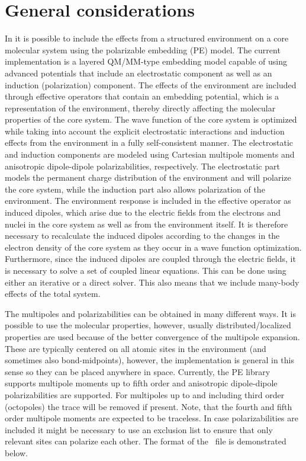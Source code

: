 \section{General considerations}
In {\dalton} it is possible to include the effects from a structured
environment on a core molecular system using the polarizable embedding (PE)
model. The current implementation is a layered QM/MM-type embedding model
capable of using advanced potentials that include an electrostatic component as
well as an induction (polarization) component. The effects of the environment
are included through effective operators that contain an embedding potential,
which is a representation of the environment, thereby directly affecting the
molecular properties of the core system. The wave function of the core system
is optimized while taking into account the explicit electrostatic interactions
and induction effects from the environment in a fully self-consistent manner.
The electrostatic and induction components are modeled using Cartesian
multipole moments and anisotropic dipole-dipole polarizabilities, respectively.
The electrostatic part models the permanent charge distribution of the
environment and will polarize the core system, while the induction part also
allows polarization of the environment. The environment response is included in
the effective operator as induced dipoles, which arise due to the electric
fields from the electrons and nuclei in the core system as well as from the
environment itself. It is therefore necessary to recalculate the induced dipoles
according to the changes in the electron density of the core system as they
occur in a wave function optimization. Furthermore, since the induced dipoles
are coupled through the electric fields, it is necessary to solve a set of
coupled linear equations. This can be done using either an iterative or a
direct solver. This also means that we include many-body effects of the total system.

The multipoles and polarizabilities can be obtained in many different ways. It
is possible to use the molecular properties, however, usually
distributed/localized properties are used because of the better convergence of
the multipole expansion. These are typically centered on all atomic sites in
the environment (and sometimes also bond-midpoints), however, the
implementation is general in this sense so they can be placed anywhere in
space. Currently, the PE library supports multipole moments up to fifth order and
anisotropic dipole-dipole polarizabilities are supported. For multipoles up to and
including third order (octopoles) the trace will be removed if present. Note, that
the fourth and fifth order multipole moments are expected to be traceless. In case
polarizabilities are included it might be necessary to use an exclusion list
to ensure that only relevant sites can polarize each other. The format of
the \potinp\ file is demonstrated below.

